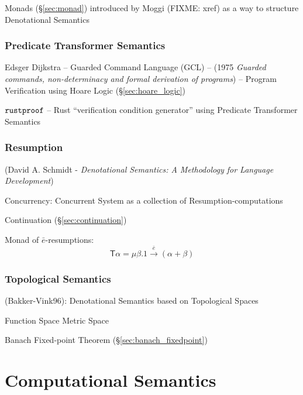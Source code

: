 \fist Monads (\S\ref{sec:monad}) introduced by Moggi (FIXME: xref) as a way to
structure Denotational Semantics



\subsubsection{Predicate Transformer Semantics}
\label{sec:predicate_transformer_semantics}

Edsger Dijkstra -- Guarded Command Language (GCL) -- (1975
\emph{Guarded commands, non-determinacy and formal derivation of
  programs}) -- Program Verification using Hoare Logic
(\S\ref{sec:hoare_logic})

$\mathtt{rustproof}$ -- Rust ``verification condition generator'' using
Predicate Transformer Semantics



\subsubsection{Resumption}\label{sec:resumption}

(David A. Schmidt - \emph{Denotational Semantics: A Methodology for
  Language Development}) %

Concurrency: Concurrent System as a collection of
Resumption-computations \cite{filinski99}

Continuation (\S\ref{sec:continuation})

Monad of $\bar{e}$-resumptions: \cite{filinski99} %
\[
  \mathsf{T}\alpha = \mu \beta. 1 \xrightarrow{\bar{e}} (\alpha + \beta)
\]



\subsubsection{Topological Semantics}\label{sec:topological_semantics}

(Bakker-Vink96): Denotational Semantics based on Topological Spaces

Function Space Metric Space %

Banach Fixed-point Theorem (\S\ref{sec:banach_fixedpoint})



\section{Computational Semantics}\label{sec:computational_semantics}

